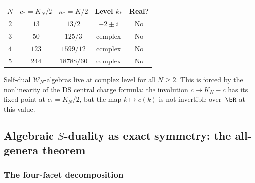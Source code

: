 \begin{computation}
\renewcommand{\arraystretch}{1.4}
\begin{center}
\begin{tabular}{ccccc}
\toprule
$N$ & $c_* = K_N/2$ & $\kappa_* = K/2$ & Level $k_*$ & Real? \\
\midrule
$2$ & $13$ & $13/2$ & $-2 \pm i$ & No \\
$3$ & $50$ & $125/3$ & complex & No \\
$4$ & $123$ & $1599/12$ & complex & No \\
$5$ & $244$ & $18788/60$ & complex & No \\
\bottomrule
\end{tabular}
\end{center}
Self-dual $\mathcal{W}_N$-algebras live at complex level for all
$N \geq 2$. This is forced by the nonlinearity of the DS central
charge formula: the involution $c \mapsto K_N - c$ has its fixed
point at $c_* = K_N/2$, but the map $k \mapsto c(k)$ is not
invertible over~$\bR$ at this value.
\end{computation}

%
%

\subsection{Algebraic $S$-duality as exact symmetry: the all-genera theorem}

\subsubsection{The four-facet decomposition}

